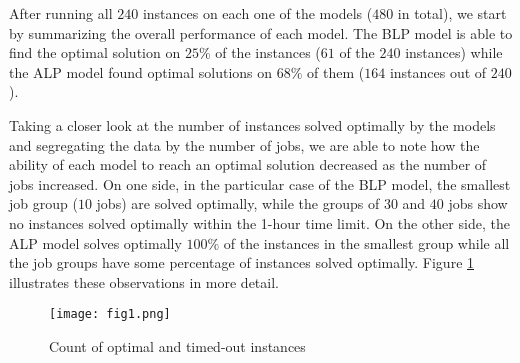After running all $240$ instances on each one of the models ($480$ in total), we start by summarizing the overall performance of each model. The BLP model is able to find the optimal solution on $25\%$ of the instances ($61$ of the $240$ instances) while the ALP model found optimal solutions on $68\%$ of them ($164$ instances out of $240$).

Taking a closer look at the number of instances solved optimally by the models and segregating the data by the number of jobs, we are able to note how the ability of each model to reach an optimal solution decreased as the number of jobs increased. On one side, in the particular case of the BLP model, the smallest job group ($10$ jobs) are solved optimally, while the groups of $30$ and $40$ jobs show no instances solved optimally within the 1-hour time limit. On the other side, the ALP model solves optimally $100\%$ of the instances in the smallest group while all the job groups have some percentage of instances solved optimally. Figure \ref{fig:f1} illustrates these observations in more detail.
\begin{figure}[h!]
\caption{Count of optimal and timed-out instances}
\label{fig:f1}
\centering
\texttt{[image: fig1.png]}
\end{figure}

